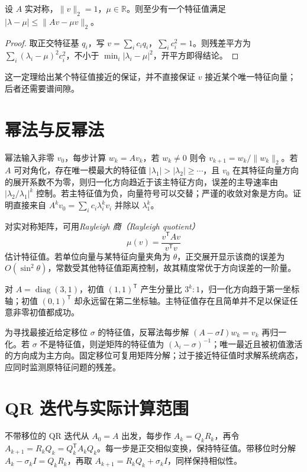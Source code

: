 \documentclass[UTF8,12pt,a4paper,fontset=fandol]{ctexbook}
\begin{document}
\begin{proposition}[对称矩阵的残差界]
设 $A$ 实对称，$\|v\|_2=1$，$\mu\in\mathbb R$。则至少有一个特征值满足 $|\lambda-\mu|\le\|Av-\mu v\|_2$。
\end{proposition}
\begin{proof}
取正交特征基 $q_i$，写 $v=\sum_i c_iq_i$，$\sum_i c_i^2=1$。则残差平方为 $\sum_i(\lambda_i-\mu)^2c_i^2$，不小于 $\min_i|\lambda_i-\mu|^2$，开平方即得结论。
\end{proof}
这一定理给出某个特征值接近的保证，并不直接保证 $v$ 接近某个唯一特征向量；后者还需要谱间隙。

\section{幂法与反幂法}
幂法输入非零 $v_0$，每步计算 $w_k=Av_k$，若 $w_k\ne0$ 则令 $v_{k+1}=w_k/\|w_k\|_2$。若 $A$ 可对角化，存在唯一模最大的特征值 $|\lambda_1|>|\lambda_2|\ge\cdots$，且 $v_0$ 在其特征向量方向的展开系数不为零，则归一化方向趋近于该主特征方向，误差的主导速率由 $|\lambda_2/\lambda_1|^k$ 控制。若主特征值为负，向量符号可以交替；严谨的收敛对象是方向。证明直接来自 $A^kv_0=\sum_i c_i\lambda_i^kv_i$ 并除以 $\lambda_1^k$。

对实对称矩阵，可用\emph{Rayleigh 商（Rayleigh quotient）}
\[
 \mu(v)=\frac{v^{\mathsf T}Av}{v^{\mathsf T}v}
\]
估计特征值。若单位向量与某特征向量夹角为 $\theta$，正交展开显示该商的误差为 $O(\sin^2\theta)$，常数受其他特征值距离控制，故其精度常优于方向误差的一阶量。

\begin{example}[缺失主方向的初值]
对 $A=\operatorname{diag}(3,1)$，初值 $(1,1)^{\mathsf T}$ 产生分量比 $3^k:1$，归一化方向趋于第一坐标轴；初值 $(0,1)^{\mathsf T}$ 却永远留在第二坐标轴。主特征值存在且简单并不足以保证任意非零初值都成功。
\end{example}

为寻找最接近给定移位 $\sigma$ 的特征值，反幂法每步解 $(A-\sigma I)w_k=v_k$ 再归一化。若 $\sigma$ 不是特征值，则逆矩阵的特征值为 $(\lambda_i-\sigma)^{-1}$；唯一最近且被初值激活的方向成为主方向。固定移位可复用矩阵分解；过于接近特征值时求解系统病态，应同时监测原特征问题的残差。

\section{QR 迭代与实际计算范围}
不带移位的 QR 迭代从 $A_0=A$ 出发，每步作 $A_k=Q_kR_k$，再令 $A_{k+1}=R_kQ_k=Q_k^{\mathsf T}A_kQ_k$。每一步是正交相似变换，保持特征值。带移位时分解 $A_k-\sigma_kI=Q_kR_k$，再取 $A_{k+1}=R_kQ_k+\sigma_kI$，同样保持相似性。
\end{document}
